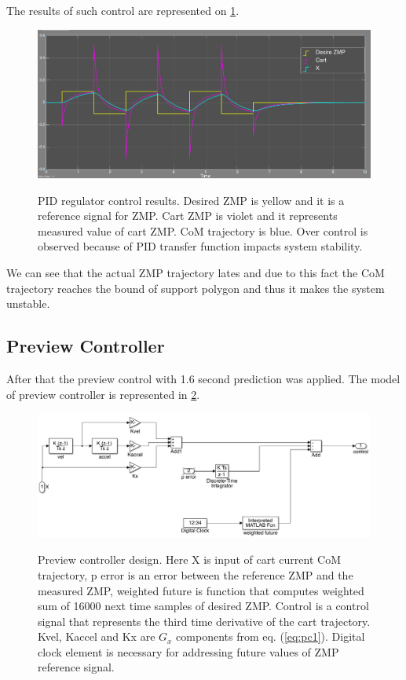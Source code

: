 \documentclass[12pt,a4paper]{report}
\begin{document}
				The results of such control are represented on \cref{fig:17}.
				
				\begin{figure}[H]
					\vspace{-0.2cm}
					\centering
					{\includegraphics[width=1\textwidth]{17}}
					\caption{PID regulator control results. Desired ZMP is yellow and it is a reference signal for ZMP. Cart ZMP is violet and it represents measured value of cart ZMP. CoM trajectory is blue. Over control is observed because of PID transfer function impacts system stability.}
					\label{fig:17}
					\vspace{-0.1cm}
				\end{figure}
				
				We can see that the actual ZMP trajectory lates and due to this fact the CoM trajectory reaches the bound of support polygon and thus it makes the system unstable.
			
			\subsection{Preview Controller}
				After that the preview control with 1.6 second prediction was applied. The model of preview controller  is represented in \cref{fig:18}.
				
				\begin{figure}[H]
					\vspace{-0.2cm}
					\centering
					{\includegraphics[width=1\textwidth]{18}}
					\caption{Preview controller design. Here X is input of cart current CoM trajectory, p error is an error between the reference ZMP and the measured ZMP, weighted future is function that computes weighted sum of 16000 next time samples of desired ZMP. Control is a control signal that represents the third time derivative of the cart trajectory. Kvel, Kaccel and Kx are $G_x$ components from eq. (\ref{eq:pc1}). Digital clock element is necessary for addressing future values of ZMP reference signal.}
					\label{fig:18}
					\vspace{-0.1cm}
				\end{figure}
				
\end{document}

